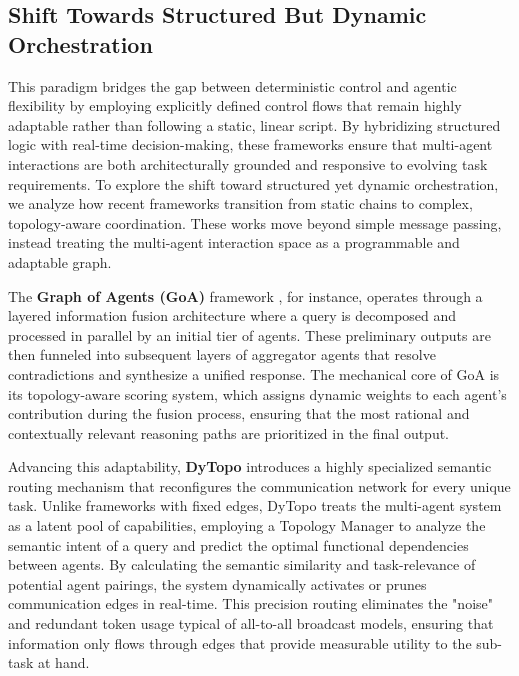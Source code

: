 \subsection{Shift Towards Structured But Dynamic Orchestration}
This paradigm bridges the gap between deterministic control and agentic flexibility by employing explicitly defined control flows that remain highly adaptable rather than following a static, linear script. By hybridizing structured logic with real-time decision-making, these frameworks ensure that multi-agent interactions are both architecturally grounded and responsive to evolving task requirements.
To explore the shift toward structured yet dynamic orchestration, we analyze how recent frameworks transition from static chains to complex, topology-aware coordination. These works move beyond simple message passing, instead treating the multi-agent interaction space as a programmable and adaptable graph.

 The \textbf{Graph of Agents (GoA)} framework \citep{joo2025graphagentsprincipledlong}, for instance, operates through a layered information fusion architecture where a query is decomposed and processed in parallel by an initial tier of agents. These preliminary outputs are then funneled into subsequent layers of aggregator agents that resolve contradictions and synthesize a unified response. The mechanical core of GoA is its topology-aware scoring system, which assigns dynamic weights to each agent’s contribution during the fusion process, ensuring that the most rational and contextually relevant reasoning paths are prioritized in the final output.

Advancing this adaptability, \textbf{DyTopo} \citep{lu2026dytopodynamictopologyrouting} introduces a highly specialized semantic routing mechanism that reconfigures the communication network for every unique task. Unlike frameworks with fixed edges, DyTopo treats the multi-agent system as a latent pool of capabilities, employing a Topology Manager to analyze the semantic intent of a query and predict the optimal functional dependencies between agents. By calculating the semantic similarity and task-relevance of potential agent pairings, the system dynamically activates or prunes communication edges in real-time. This precision routing eliminates the "noise" and redundant token usage typical of all-to-all broadcast models, ensuring that information only flows through edges that provide measurable utility to the sub-task at hand.

